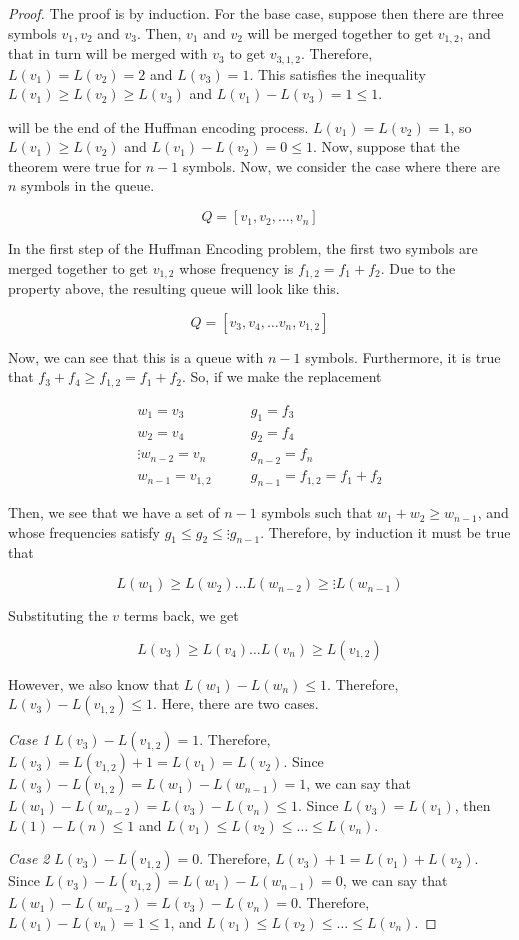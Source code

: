 \documentclass{article}
\begin{document}
\begin{proof}
	The proof is by induction. For the base case, suppose then there are three symbols $v_1, v_2$ and $v_3$. Then, $v_1$ and $v_2$ will be merged together to get $v_{1,2}$, and that in turn will be merged with $v_3$ to get $v_{3,1,2}$. Therefore, $L(v_1) = L(v_2) = 2$ and $L(v_3) = 1$. This satisfies the inequality $L(v_1) \geq L(v_2) \geq L(v_3)$ and $L(v_1) - L(v_3) = 1 \leq 1$. 


  will be the end of the Huffman encoding process. $L(v_1) = L(v_2) = 1$, so $L(v_1) \geq L(v_2)$ and $L(v_1) - L(v_2) = 0 \leq 1$.
Now, suppose that the theorem were true for $n-1$ symbols. Now, we consider the case where there are $n$ symbols in the queue.

$$
Q = \left[ v_1, v_2, \ldots, v_n \right]
$$ 

In the first step of the Huffman Encoding problem, the first two symbols are merged together to get $v_{1, 2}$ whose frequency is $f_{1,2} = f_1 + f_2$. Due to the property above, the resulting queue will look like this.

$$
Q = \left[ v_3, v_4, \ldots v_n, v_{1,2} \right]
$$

Now, we can see that this is a queue with $n-1$ symbols. Furthermore, it is true that $f_3 + f_4 \geq f_{1,2} = f_1 + f_2$. So, if we make the replacement

\begin{align*}
	w_1 = v_3 &\qquad g_1 = f_3\\
	w_2 = v_4 &\qquad g_2 = f_4\\
	\vdots
	w_{n-2} = v_n &\qquad g_{n-2} = f_n\\
	w_{n-1} = v_{1,2} &\qquad g_{n-1} = f_{1,2} = f_1 + f_2	
\end{align*}

Then, we see that we have a set of $n-1$ symbols such that $w_1 + w_2 \geq w_{n-1}$, and whose frequencies satisfy $g_1 \leq g_2 \leq \vdots g_{n-1}$. Therefore, by induction it must be true that 

$$
L(w_1) \geq L(w_2) \ldots L(w_{n-2}) \geq \vdots L(w_{n-1})
$$

Substituting the $v$ terms back, we get

$$
L(v_3) \geq L(v_4) \ldots L(v_n) \geq L(v_{1,2})
$$

However, we also know that $L(w_1) - L(w_n) \leq 1$. Therefore, $L(v_3) - L(v_{1,2}) \leq 1$. Here, there are two cases.

\textit{Case 1}
$L(v_3) - L(v_{1,2}) = 1$. Therefore, $L(v_3) = L(v_{1,2}) + 1 = L(v_1) = L(v_2)$. Since $L(v_3) - L(v_{1,2}) = L(w_1) - L(w_{n-1}) = 1$, we can say that $L(w_1) - L(w_{n-2}) = L(v_3) - L(v_n) \leq 1$. Since $L(v_3) = L(v_1)$, then $L(1) - L(n) \leq 1$ and $L(v_1) \leq L(v_2) \leq \ldots \leq L(v_n)$.

\textit{Case 2}
$L(v_3) - L(v_{1,2}) = 0$. Therefore, $L(v_3) + 1 = L(v_1) + L(v_2)$. Since $L(v_3) - L(v_{1,2}) = L(w_1) - L(w_{n-1}) = 0$, we can say that $L(w_1) - L(w_{n-2}) = L(v_3) - L(v_n) = 0$. Therefore, $L(v_1) - L(v_n)  = 1 \leq 1$, and $L(v_1) \leq L(v_2) \leq \ldots \leq L(v_n)$. \qedhere
\end{proof}	  
\end{document}
